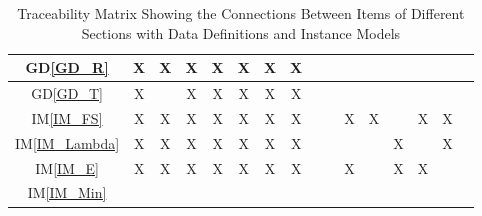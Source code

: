 \documentclass[12pt]{article}
\newcommand{\iref}[1]{IM\ref{#1}}
\newcommand{\dref}[1]{GD\ref{#1}}
\begin{document}
{\begin{landscape}
\begin{table}[h!]
\begin{tabular}{|c|c|c|c|c|c|c|c|c|c|c|c|c|c|c|c|}
\dref{GD_R}            & X& X& X& X& X& X& X& & & & & & & & \\ 
\hline
\dref{GD_T}            & X& & X& X& X& X& X& & & & & & & & \\ 
\hline
\iref{IM_FS}            & X& X& X& X& X& X& X& & & X& X& & X& X& \\ 
\hline
\iref{IM_Lambda}        & X& X& X& X& X& X& X& & & & & X& & X& \\ 
\hline
\iref{IM_E}             & X& X& X& X& X& X& X& & & X& & X& X& & \\ 
\hline
\iref{IM_Min}           & & & & & & & & & & & & & & & \\
\hline
\end{tabular}
\caption{Traceability Matrix Showing the Connections Between Items of Different 
	Sections with Data Definitions and Instance Models}
\label{Table:trace2}
\end{table}
\end{landscape}
}
\end{document}
